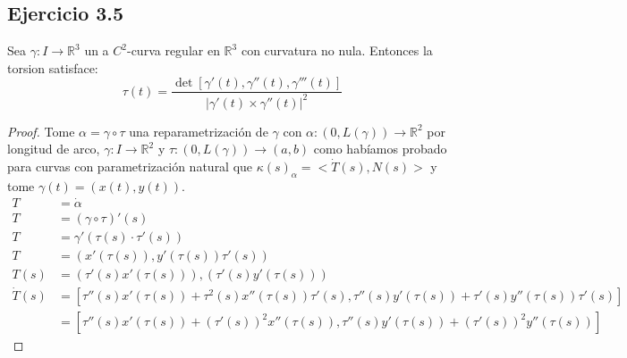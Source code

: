 \documentclass[12pt]{article}
\begin{document}
\subsection*{Ejercicio 3.5}
Sea $\gamma : I \rightarrow \mathbb{R}^3$ un a $C^2$-curva regular en $\mathbb{R}^3$ con curvatura no nula. Entonces la torsion satisface:
\begin{equation*}
\tau (t)=\frac{\det [\gamma '(t), \gamma ''(t), \gamma ''' (t)]}{|\gamma'(t) \times \gamma '' (t)|^2 }
\end{equation*}
\begin{proof}
Tome $\alpha= \gamma \circ \tau$ una reparametrizaci\'on de $\gamma$ con $\alpha: (0,L(\gamma)) \rightarrow \mathbb{R}^2$ por longitud de arco, $\gamma:I \rightarrow \mathbb{R}^2$ y $\tau: (0,L(\gamma)) \rightarrow (a,b)$ como hab\'iamos probado para curvas con parametrizaci\'on natural que $\kappa(s)_{\alpha}=<\dot{T}(s),N(s)>$ y tome $\gamma(t)=(x(t),y(t))$.
\begin{equation*}
\begin{split}
T&=\dot{\alpha}\\
T&=(\gamma \circ \tau)'(s)\\
T&=\gamma'(\tau(s) \cdot \tau'(s))\\
T&=(x'(\tau(s)), y'(\tau(s))\tau'(s))\\
T(s)&=(\tau'(s)x'(\tau(s))), (\tau'(s)y'(\tau(s)))\\
\dot{T}(s)&=[\tau''(s)x'(\tau(s)) + \tau^2(s)x''(\tau(s))\tau'(s), \tau''(s)y'(\tau(s))+\tau'(s)y''(\tau(s))\tau'(s)] \\
&=[\tau''(s)x'(\tau(s))+(\tau'(s))^2x''(\tau(s)), \tau''(s)y'(\tau(s))+(\tau'(s))^2y''(\tau(s))]
\end{split}
\end{equation*}


\end{proof}
\end{document}
